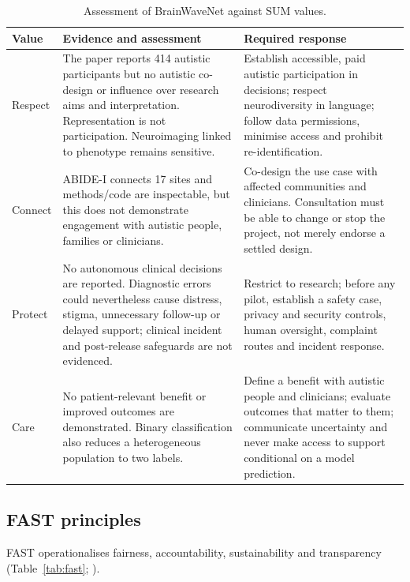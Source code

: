 \documentclass[11pt,a4paper]{article}
\begin{document}
\begin{table}[H]
\centering
\caption{Assessment of BrainWaveNet against SUM values.}
\label{tab:sum}
\small
\begin{tabularx}{\textwidth}{p{2.1cm}Y Y}
\toprule
\textbf{Value} & \textbf{Evidence and assessment} & \textbf{Required response}\\
\midrule
Respect & The paper reports 414 autistic participants but no autistic co-design or influence over research aims and interpretation. Representation is not participation. Neuroimaging linked to phenotype remains sensitive. & Establish accessible, paid autistic participation in decisions; respect neurodiversity in language; follow data permissions, minimise access and prohibit re-identification.\\
Connect & ABIDE-I connects 17 sites and methods/code are inspectable, but this does not demonstrate engagement with autistic people, families or clinicians. & Co-design the use case with affected communities and clinicians. Consultation must be able to change or stop the project, not merely endorse a settled design.\\
Protect & No autonomous clinical decisions are reported. Diagnostic errors could nevertheless cause distress, stigma, unnecessary follow-up or delayed support; clinical incident and post-release safeguards are not evidenced. & Restrict to research; before any pilot, establish a safety case, privacy and security controls, human oversight, complaint routes and incident response.\\
Care & No patient-relevant benefit or improved outcomes are demonstrated. Binary classification also reduces a heterogeneous population to two labels. & Define a benefit with autistic people and clinicians; evaluate outcomes that matter to them; communicate uncertainty and never make access to support conditional on a model prediction.\\
\bottomrule
\end{tabularx}
\end{table}

\subsection{FAST principles}
FAST operationalises fairness, accountability, sustainability and transparency (Table~\ref{tab:fast}; \cite{leslie2019}).
\end{document}
